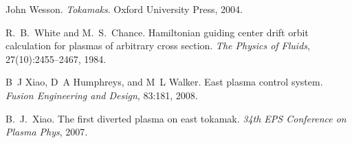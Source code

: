 \documentclass{article}
\newcommand{\tmtextit}[1]{{\itshape{#1}}}
\begin{document}
\begin{thebibliography}{10}
  John Wesson. {\newblock}\tmtextit{Tokamaks}.
  {\newblock}Oxford University Press, 2004.{\newblock}
  
  R.~B.~White  and  M.~S.~Chance.
  {\newblock}Hamiltonian guiding center drift orbit calculation for plasmas of
  arbitrary cross section. {\newblock}\tmtextit{The Physics of Fluids},
  27(10):2455--2467, 1984.{\newblock}
  
  B~J Xiao, D~A Humphreys, and  M~L Walker.
  {\newblock}East plasma control system. {\newblock}\tmtextit{Fusion
  Engineering and Design}, 83:181, 2008.{\newblock}
  
  B.~J.~Xiao. {\newblock}The first diverted plasma on
  east tokamak. {\newblock}\tmtextit{34th EPS Conference on Plasma Phys},
  2007.{\newblock}
\end{thebibliography}
\end{document}
